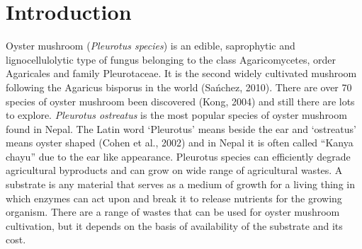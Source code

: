\documentclass[]{elsarticle} %
\begin{document}
\clearpage

\hypertarget{introduction}{%
\section{Introduction}\label{introduction}}

Oyster mushroom (\textit{Pleurotus species}) is an edible, saprophytic
and lignocellulolytic type of fungus belonging to the class
Agaricomycetes, order Agaricales and family Pleurotaceae. It is the
second widely cultivated mushroom following the Agaricus bisporus in the
world (Sańchez, 2010). There are over 70 species of oyster mushroom been
discovered (Kong, 2004) and still there are lots to explore.
\textit{Pleurotus ostreatus} is the most popular species of oyster
mushroom found in Nepal. The Latin word `Pleurotus' means beside the ear
and `ostreatus' means oyster shaped (Cohen et al., 2002) and in Nepal it
is often called ``Kanya chayu'' due to the ear like appearance.
Pleurotus species can efficiently degrade agricultural byproducts and
can grow on wide range of agricultural wastes. A substrate is any
material that serves as a medium of growth for a living thing in which
enzymes can act upon and break it to release nutrients for the growing
organism. There are a range of wastes that can be used for oyster
mushroom cultivation, but it depends on the basis of availability of the
substrate and its cost.
\end{document}

